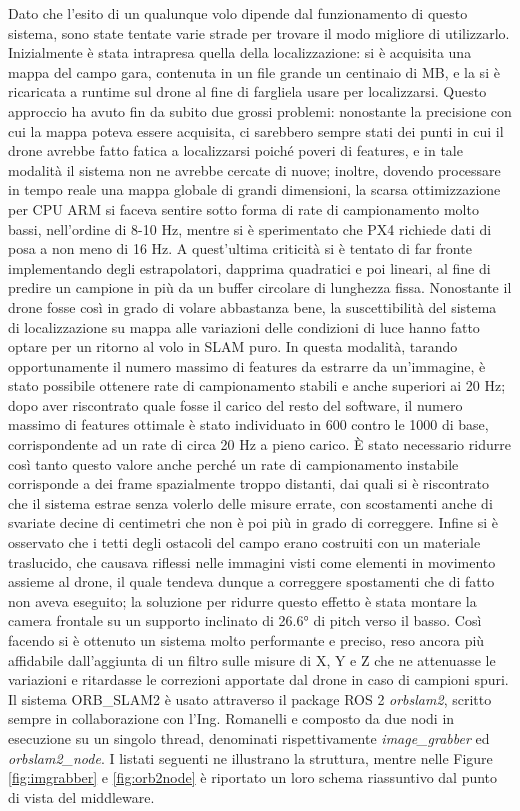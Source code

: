 Dato che l'esito di un qualunque volo dipende dal funzionamento di questo sistema, sono state tentate varie strade per trovare il modo migliore di utilizzarlo. Inizialmente è stata intrapresa quella della localizzazione: si è acquisita una mappa del campo gara, contenuta in un file grande un centinaio di MB, e la si è ricaricata a runtime sul drone al fine di fargliela usare per localizzarsi. Questo approccio ha avuto fin da subito due grossi problemi: nonostante la precisione con cui la mappa poteva essere acquisita, ci sarebbero sempre stati dei punti in cui il drone avrebbe fatto fatica a localizzarsi poiché poveri di features, e in tale modalità il sistema non ne avrebbe cercate di nuove; inoltre, dovendo processare in tempo reale una mappa globale di grandi dimensioni, la scarsa ottimizzazione per CPU ARM si faceva sentire sotto forma di rate di campionamento molto bassi, nell'ordine di 8-10 Hz, mentre si è sperimentato che PX4 richiede dati di posa a non meno di 16 Hz. A quest'ultima criticità si è tentato di far fronte implementando degli estrapolatori, dapprima quadratici e poi lineari, al fine di predire un campione in più da un buffer circolare di lunghezza fissa. Nonostante il drone fosse così in grado di volare abbastanza bene, la suscettibilità del sistema di localizzazione su mappa alle variazioni delle condizioni di luce hanno fatto optare per un ritorno al volo in SLAM puro. In questa modalità, tarando opportunamente il numero massimo di features da estrarre da un'immagine, è stato possibile ottenere rate di campionamento stabili e anche superiori ai 20 Hz; dopo aver riscontrato quale fosse il carico del resto del software, il numero massimo di features ottimale è stato individuato in 600 contro le 1000 di base, corrispondente ad un rate di circa 20 Hz a pieno carico. È stato necessario ridurre così tanto questo valore anche perché un rate di campionamento instabile corrisponde a dei frame spazialmente troppo distanti, dai quali si è riscontrato che il sistema estrae senza volerlo delle misure errate, con scostamenti anche di svariate decine di centimetri che non è poi più in grado di correggere. Infine si è osservato che i tetti degli ostacoli del campo erano costruiti con un materiale traslucido, che causava riflessi nelle immagini visti come elementi in movimento assieme al drone, il quale tendeva dunque a correggere spostamenti che di fatto non aveva eseguito; la soluzione per ridurre questo effetto è stata montare la camera frontale su un supporto inclinato di 26.6° di pitch verso il basso. Così facendo si è ottenuto un sistema molto performante e preciso, reso ancora più affidabile dall'aggiunta di un filtro sulle misure di X, Y e Z che ne attenuasse le variazioni e ritardasse le correzioni apportate dal drone in caso di campioni spuri.\\
Il sistema ORB\_SLAM2 è usato attraverso il package ROS 2 \emph{orbslam2}, scritto sempre in collaborazione con l'Ing. Romanelli e composto da due nodi in esecuzione su un singolo thread, denominati rispettivamente \emph{image\_grabber} ed \emph{orbslam2\_node}. I listati seguenti ne illustrano la struttura, mentre nelle Figure \ref{fig:imgrabber} e \ref{fig:orb2node} è riportato un loro schema riassuntivo dal punto di vista del middleware.

